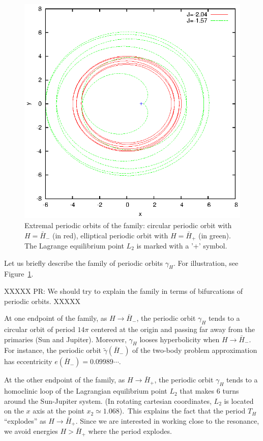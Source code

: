 \begin{figure}
\includegraphics{figs/trtbp_porbits}
\caption{Extremal periodic orbits of the family: circular periodic
orbit with $H=\bar H_-$ (in red), elliptical periodic orbit with
$H=\bar H_+$ (in green). The Lagrange equilibrium point $L_2$ is
marked with a '+' symbol.}
\label{fig:trtbp_porbits}
\end{figure}

Let us briefly describe the family of periodic orbits $\gamma_H$. 
For illustration, see Figure~\ref{fig:trtbp_porbits}.

XXXXX PR: We should try to explain the family in terms of bifurcations
of periodic orbits. XXXXX

At one endpoint of the family, as $H \to \bar H_-$, the periodic orbit
$\gamma_H$ tends to a circular orbit of period $14\pi$ centered at the
origin and passing far away from the primaries (Sun and Jupiter).
Moreover, $\gamma_H$ looses hyperbolicity when $H \to \bar H_-$.
For instance, the periodic orbit $\tilde \gamma(\bar H_-)$ of the two-body
problem approximation has eccentricity $e(\bar H_-)=0.09989\cdots$.

At the other endpoint of the family, as $H \to \bar H_+$, the periodic
orbit $\gamma_H$ tends to a homoclinic loop of the Lagrangian
equilibrium point $L_2$ that makes $6$ turns around the Sun-Jupiter
system. 
(In rotating cartesian coordinates, $L_2$ is located on the $x$ axis at
the point $x_2 \simeq 1.068$).\ 
This explains the fact that the period $T_H$ ``explodes'' as $H \to
\bar H_+$. Since we are interested in working close to the resonance,
we avoid energies $H > \bar H_+$ where the period explodes.


